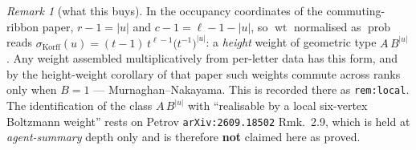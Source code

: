 \documentclass[11pt]{article}
\theoremstyle{remark}
\newtheorem{remark}[theorem]{Remark}
\DeclareMathOperator{\wt}{wt}
\DeclareMathOperator{\prob}{prob}
\begin{document}
\begin{remark}[what this buys]
In the occupancy coordinates of the commuting-ribbon paper, $r-1=|u|$ and $c-1=\ell-1-|u|$, so
$\wt$ normalised as $\prob$ reads
$\sigma_{\mathrm{Korff}}(u)=(t-1)\,t^{\ell-1}\bigl(t^{-1}\bigr)^{|u|}$: a \emph{height} weight
of geometric type $A\,B^{|u|}$.  Any weight assembled multiplicatively from per-letter data has
this form, and by the height-weight corollary of that paper such weights commute across ranks
only when $B=1$ --- Murnaghan--Nakayama.  This is recorded there as
\texttt{rem:local}.  The identification of the class $A\,B^{|u|}$ with ``realisable by a local
six-vertex Boltzmann weight'' rests on Petrov \texttt{arXiv:2609.18502} Rmk.~2.9, which is held
at \emph{agent-summary} depth only and is therefore \textbf{not} claimed here as proved.
\end{remark}
\end{document}
